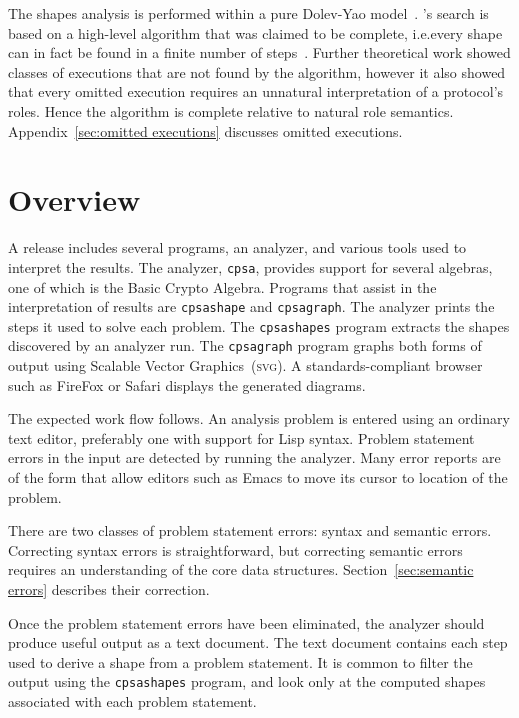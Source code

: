 \documentclass[12pt]{article}
\begin{document}
The shapes analysis is performed within a pure Dolev-Yao
model~\cite{DolevYao83}.  {\cpsa}'s search is based on a high-level
algorithm that was claimed to be complete, i.e.\@ every shape can in
fact be found in a finite number of
steps~\cite{DoghmiGuttmanThayer07,Guttman11}.  Further theoretical
work showed classes of executions that are not found by the algorithm,
however it also showed that every omitted execution requires an
unnatural interpretation of a protocol's roles.  Hence the algorithm
is complete relative to natural role semantics.
Appendix~\ref{sec:omitted executions} discusses omitted executions.

\section{Overview}

A {\cpsa} release includes several programs, an analyzer, and various
tools used to interpret the results.  The analyzer, \texttt{cpsa},
provides support for several algebras, one of which is the Basic
Crypto Algebra.  Programs that assist in the interpretation of results
are \texttt{cpsashape} and \texttt{cpsagraph}.  The analyzer prints
the steps it used to solve each problem.  The \texttt{cpsashapes}
program extracts the shapes discovered by an analyzer run.  The
\texttt{cpsagraph} program graphs both forms of output using Scalable
Vector Graphics~(\textsc{svg}).  A standards-compliant browser such as
FireFox or Safari displays the generated diagrams.

The expected work flow follows.  An analysis problem is entered using
an ordinary text editor, preferably one with support for Lisp syntax.
Problem statement errors in the input are detected by running the
analyzer.  Many error reports are of the form that allow editors such
as Emacs to move its cursor to location of the problem.

There are two classes of problem statement errors: syntax and semantic
errors.  Correcting syntax errors is straightforward, but correcting
semantic errors requires an understanding of the core data structures.
Section~\ref{sec:semantic errors} describes their correction.

Once the problem statement errors have been eliminated, the analyzer
should produce useful output as a text document.  The text document
contains each step used to derive a shape from a problem statement.
It is common to filter the output using the \texttt{cpsashapes}
program, and look only at the computed shapes associated with each
problem statement.
\end{document}
